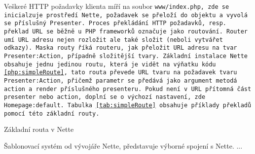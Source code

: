  \label{section:routovani}
Veškeré HTTP požadavky klienta míří na soubor \tt{www/index.php}, zde se inicialzuje prostředí Nette, požadavek se přeloží do objektu  a vyvolá se příslušný Presenter. Proces překládání HTTP požadavků, resp. překlad URL se běžně u PHP frameworků označuje jako routování. Router umí URL adresu nejen rozložit ale také složit (neboli vytvářet odkazy). Maska routy říká routeru, jak přeložit URL adresu na tvar \texttt{Presenter:Action}, případně složitější tvary\cite{NetteRoutovani}. Základní instalace Nette obsahuje jednu jedinou routu, která je vidět na výňatku kódu \ref{php:simpleRoute}, tato routa převede URL tvaru  na požadavek tvaru \texttt{Presenter:Action}, přičemž parametr  se předává jako argument metodá action a render příslušného presenteru. Pokud není v URL přítomná část presenter nebo action, doplní se o výchozí nastavení, zde \texttt{Homepage:default}. Tabulka \ref{tab:simpleRoute} obsahuje příklady překladů pomocí této základní routy.

\begin{listing}[ht]
\caption{Základní routa v Nette}
\label{php:simpleRoute}
\end{listing}


Šablonovací systém od vývojáře Nette, představuje výborné spojení s Nette. ...
